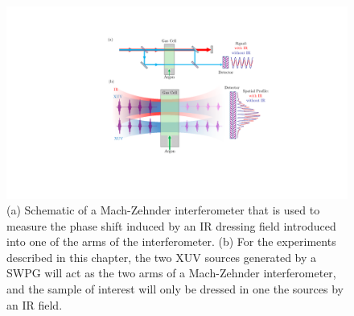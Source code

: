 \begin{figure}
	\centering
	\includegraphics[width=1.0\textwidth]{figures/CATS/CATS_mach_zehnder.pdf}
	\caption[Schematic of Mach-Zehnder interferometer and spatial profile with and without an IR dressing field in one arm of the interferometer]{(a) Schematic of a Mach-Zehnder interferometer that is used to measure the phase shift induced by an IR dressing field introduced into one of the arms of the interferometer. (b) For the experiments described in this chapter, the two XUV sources generated by a SWPG will act as the two arms of a Mach-Zehnder interferometer, and the sample of interest will only be dressed in one the sources by an IR field.}
	\label{fig:CATS_mach-zehnder_interferometer}
\end{figure}


